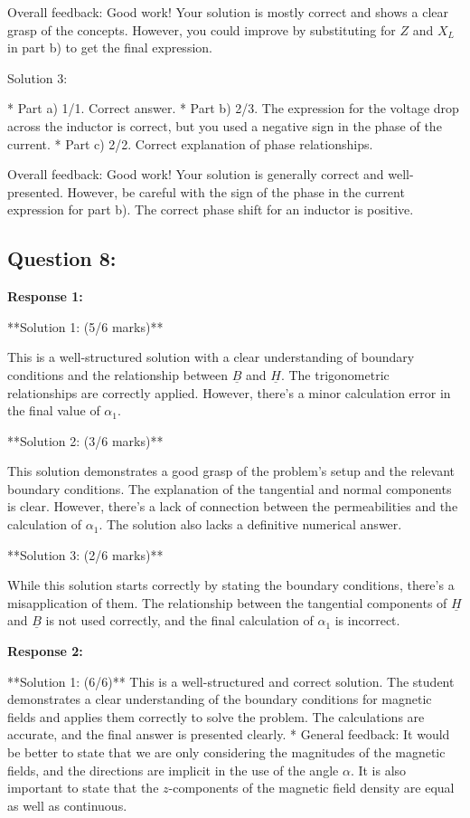 \documentclass[a4paper,11pt]{article}
\begin{document}
Overall feedback: Good work! Your solution is mostly correct and shows a clear grasp of the concepts. However, you could improve by substituting for $Z$ and $X_L$ in part b) to get the final expression.

Solution 3:

*   Part a) 1/1. Correct answer.
*   Part b) 2/3. The expression for the voltage drop across the inductor is correct, but you used a negative sign in the phase of the current.
*   Part c) 2/2. Correct explanation of phase relationships.

Overall feedback: Good work! Your solution is generally correct and well-presented. However, be careful with the sign of the phase in the current expression for part b). The correct phase shift for an inductor is positive.

\subsection*{Question 8:}

\textbf{Response 1:}

**Solution 1: (5/6 marks)**

This is a well-structured solution with a clear understanding of boundary conditions and the relationship between \( \underline{B} \) and \( \underline{H} \). The trigonometric relationships are correctly applied. However, there's a minor calculation error in the final value of \( \alpha_{1} \).

**Solution 2: (3/6 marks)**

This solution demonstrates a good grasp of the problem's setup and the relevant boundary conditions. The explanation of the tangential and normal components is clear. However, there's a lack of connection between the permeabilities and the calculation of \( \alpha_{1} \). The solution also lacks a definitive numerical answer.

**Solution 3: (2/6 marks)**

While this solution starts correctly by stating the boundary conditions, there's a misapplication of them. The relationship between the tangential components of \( \underline{H} \) and \( \underline{B} \) is not used correctly, and the final calculation of \( \alpha_{1} \) is incorrect.

\bigskip    
\textbf{Response 2:}

**Solution 1: (6/6)**
This is a well-structured and correct solution. The student demonstrates a clear understanding of the boundary conditions for magnetic fields and applies them correctly to solve the problem. The calculations are accurate, and the final answer is presented clearly.
* General feedback: It would be better to state that we are only considering the magnitudes of the magnetic fields, and the directions are implicit in the use of the angle \( \alpha \). It is also important to state that the \(z\)-components of the magnetic field density are equal as well as continuous.
\end{document}
